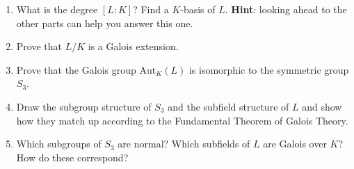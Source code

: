 \documentclass[11pt]{article}
\begin{document}
\begin{enumerate}
\begin{enumerate}
\item What is the degree $[L:K]$? Find a $K$-basis of $L$. {\bf Hint}: looking ahead to the other parts can help you answer this one.
\item Prove that $L/K$ is a Galois extension.
\item Prove that the Galois group $\mathrm{Aut}_{K}(L)$ is isomorphic to the symmetric group $S_3$.
\item Draw the subgroup structure of $S_3$ and the subfield structure of $L$ and show how they match up according to the Fundamental Theorem of Galois Theory.
\item Which subgroups of $S_3$ are normal? Which subfields of $L$ are Galois over $K$? How do these correspond?
\end{enumerate}

\end{enumerate}
\end{document}
